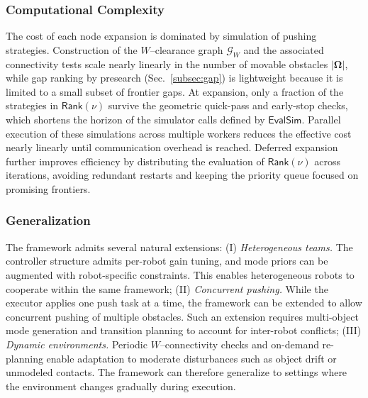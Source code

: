 \subsubsection{Computational Complexity}\label{subsubsec:complexity}
The cost of each node expansion is dominated by simulation of pushing
strategies. Construction of the $W$--clearance graph $\mathcal{G}_W$ and the
associated connectivity tests scale nearly linearly in the number of movable
obstacles $|\boldsymbol{\Omega}|$, while gap ranking by presearch
(Sec.~\ref{subsec:gap}) is lightweight because it is limited to a small subset
of frontier gaps. At expansion, only a fraction of the strategies in
$\mathsf{Rank}(\nu)$ survive the geometric quick-pass and early-stop checks,
which shortens the horizon of the simulator calls defined by
$\mathsf{EvalSim}$. Parallel execution of these simulations across multiple
workers reduces the effective cost nearly linearly until communication overhead
is reached. Deferred expansion further improves efficiency by distributing the
evaluation of $\mathsf{Rank}(\nu)$ across iterations, avoiding redundant
restarts and keeping the priority queue focused on promising frontiers.


\subsubsection{Generalization}\label{subsec:general}
The framework admits several natural extensions:
(I) \textit{Heterogeneous teams.} The controller structure admits per-robot gain
tuning, and mode priors can be augmented with robot-specific constraints.
This enables heterogeneous robots to cooperate within the same framework;
(II) \textit{Concurrent pushing.} While the executor applies one push task at a
time, the framework can be extended to allow concurrent pushing of multiple
obstacles. Such an extension requires multi-object mode generation and
transition planning to account for inter-robot conflicts;
(III) \textit{Dynamic environments.} Periodic $W$--connectivity checks and
on-demand re-planning enable adaptation to moderate disturbances such as object
drift or unmodeled contacts. The framework can therefore generalize to settings
where the environment changes gradually during execution.
